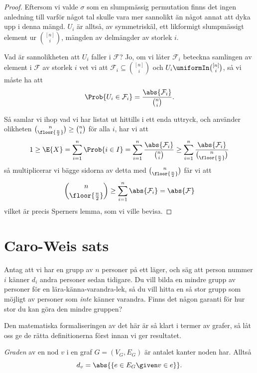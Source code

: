 \documentclass[nobib]{tufte-handout}
\begin{document}
\begin{lemma}
\begin{proof}
        Eftersom vi valde $\sigma$ som en slumpmässig permutation finns det ingen anledning till varför något tal skulle vara mer sannolikt än något annat att dyka upp i denna mängd. $U_i$ är alltså, av symmetriskäl, ett likformigt slumpmässigt element ur $\binom{[n]}{i}$, mängden av delmängder av storlek $i$.

        Vad är sannolikheten att $U_i$ faller i $\mathcal{F}$? Jo, om vi låter $\mathcal{F}_i$ beteckna samlingen av element i $\mathcal{F}$ av storlek $i$ vet vi att $\mathcal{F}_i \subseteq \binom{[n]}{i}$  och $U_i \uniformIn \binom{[n]}{i}$, så vi måste ha att
        $$\Prob{U_i \in \mathcal{F}_i} = \frac{\abs{\mathcal{F}_i}}{\binom{n}{i}}.$$

        Så samlar vi ihop vad vi har listat ut hittills i ett enda uttryck, och använder olikheten $\binom{n}{\floor{\frac{n}{2}}} \geq \binom{n}{i}$ för alla $i$, har vi att
        $$1 \geq \E{X} = \sum_{i=1}^{n} \Prob{i \in I} = \sum_{i=1}^{n} \frac{\abs{\mathcal{F}_i}}{\binom{n}{i}} \geq \sum_{i=1}^{n} \frac{\abs{\mathcal{F}_i}}{\binom{n}{\floor{\frac{n}{2}}}}$$
        så multiplicerar vi bägge sidorna av detta med $\binom{n}{\floor{\frac{n}{2}}}$ får vi att
        $$\binom{n}{\floor{\frac{n}{2}}} \geq \sum_{i=1}^{n} \abs{\mathcal{F}_i} = \abs{\mathcal{F}}$$
        vilket är precis Sperners lemma, som vi ville bevisa.
    \end{proof}
\end{lemma}

\section{Caro-Weis sats}

Antag att vi har en grupp av $n$ personer på ett läger, och säg att person nummer $i$ känner $d_i$ andra personer sedan tidigare. Du vill bilda en mindre grupp av personer för en lära-känna-varandra-lek, så du vill hitta en så stor grupp som möjligt av personer som \emph{inte} känner varandra. Finns det någon garanti för hur stor du kan göra den mindre gruppen?

Den matematiska formaliseringen av det här är så klart i termer av grafer, så låt oss ge de rätta definitionerna först innan vi ger resultatet.

\begin{definition}
    \emph{Graden} av en nod $v$ i en graf $G = (V_G, E_G)$ är antalet kanter noden har. Alltså
    $$d_v = \abs{\left\{e \in E_G \given v \in e\right\}}.$$
\end{definition}
\end{document}
